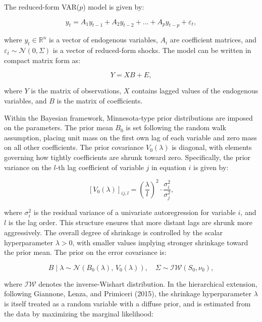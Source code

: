 \documentclass[12pt,a4paper]{report}
\begin{document}
The reduced-form VAR($p$) model is given by:

\begin{equation}
y_t = A_1 y_{t-1} + A_2 y_{t-2} + \dots + A_p y_{t-p} + \varepsilon_t,
\end{equation}

where $y_t \in \mathbb{R}^n$ is a vector of endogenous variables, $A_i$ are coefficient
matrices, and $\varepsilon_t \sim \mathcal{N}(0, \Sigma)$ is a vector of reduced-form shocks.
The model can be written in compact matrix form as:

\begin{equation}
Y = X B + E,
\end{equation}

where $Y$ is the matrix of observations, $X$ contains lagged values of the endogenous
variables, and $B$ is the matrix of coefficients.

Within the Bayesian framework, Minnesota-type prior distributions are imposed on the 
parameters. The prior mean $B_0$ is set following the random walk assumption, placing 
unit mass on the first own lag of each variable and zero mass on all other coefficients. 
The prior covariance $V_0(\lambda)$ is diagonal, with elements governing how tightly 
coefficients are shrunk toward zero. Specifically, the prior variance on the $l$-th lag 
coefficient of variable $j$ in equation $i$ is given by:

\begin{equation}
\left[V_0(\lambda)\right]_{ij,l} = 
\left(\frac{\lambda}{l}\right)^2 \cdot \frac{\sigma_i^2}{\sigma_j^2},
\end{equation}

where $\sigma_i^2$ is the residual variance of a univariate autoregression for variable 
$i$, and $l$ is the lag order. This structure ensures that more distant lags are shrunk 
more aggressively. The overall degree of shrinkage is controlled by the scalar 
hyperparameter $\lambda > 0$, with smaller values implying stronger shrinkage toward 
the prior mean. The prior on the error covariance is:

\begin{equation}
B \mid \lambda \sim \mathcal{N}(B_0(\lambda),\, V_0(\lambda)), 
\quad \Sigma \sim \mathcal{IW}(S_0, \nu_0),
\end{equation}

where $\mathcal{IW}$ denotes the inverse-Wishart distribution. In the hierarchical 
extension, following Giannone, Lenza, and Primiceri (2015), the shrinkage hyperparameter 
$\lambda$ is itself treated as a random variable with a diffuse prior, and is estimated 
from the data by maximizing the marginal likelihood:
\end{document}
